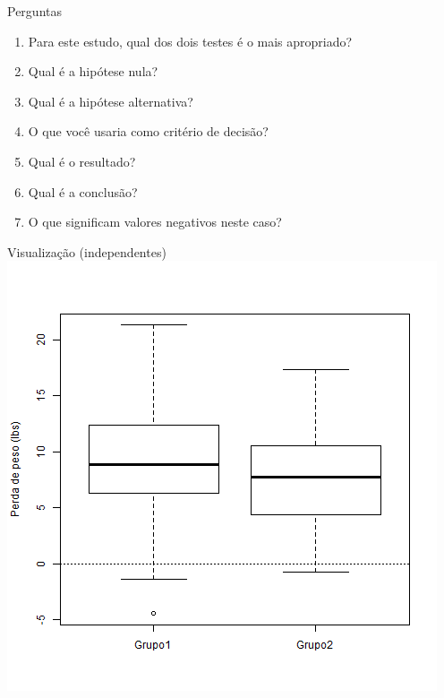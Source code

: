\documentclass{beamer}
\begin{document}
\begin{frame}[label=perguntas]{Perguntas}
  \begin{enumerate}
  \item Para este estudo, qual dos dois testes é o mais apropriado?
  \item Qual é a hipótese nula?
  \item Qual é a hipótese alternativa?
  \item O que você usaria como critério de decisão?
  \item Qual é o resultado?
  \item Qual é a conclusão?
  \item O que significam valores negativos neste caso?
  \end{enumerate}
\end{frame}

\begin{frame}{Visualização (independentes)}
  \includegraphics[height=\textheight]{Cap23-25/2-amostras-independentes}
\end{frame}
\end{document}
